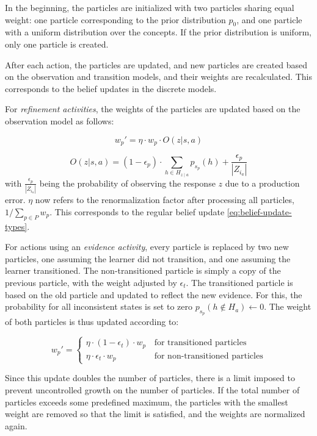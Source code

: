 In the beginning, the particles are initialized with two particles sharing equal weight: one particle corresponding to the prior distribution $p_0$, and one particle with a uniform distribution over the concepts. 
If the prior distribution is uniform, only one particle is created.

After each action, the particles are updated, and new particles are created based on the observation and transition models, and their weights are recalculated.
This corresponds to the belief updates in the discrete models.

For \textit{refinement activities}, the weights of the particles are updated based on the observation model as follows:

\begin{equation}
    w_p' = \eta \cdot w_p \cdot O(z|s,a)
\end{equation}

\begin{equation}
    O(z|s,a) = (1 - \epsilon_p) \cdot \sum_{h \in H_{z\mid a}}{p_{s_p}(h)} + \frac{\epsilon_p}{|Z_{i_a}|}
\end{equation}
with $\frac{\epsilon_p}{|Z_{i_a}|}$ being the probability of observing the response $z$ due to a production error.
$\eta$ now refers to the renormalization factor after processing all particles, $1 / \sum_{p \in P}{w_p}$.
This corresponds to the regular belief update \autoref{eq:belief-update-types}.

For actions using an \textit{evidence activity}, every particle is replaced by two new particles, one assuming the learner did not transition, and one assuming the learner transitioned.
The non-transitioned particle is simply a copy of the previous particle, with the weight adjusted by $\epsilon_t$.
The transitioned particle is based on the old particle and updated to reflect the new evidence. For this, the probability for all inconsistent states is set to zero $p_{s_p}(h \notin H_a) \leftarrow 0$.
The weight of both particles is thus updated according to:

\begin{equation}
    w_p' = \begin{cases} 
        \eta \cdot (1 - \epsilon_t) \cdot w_p & \, \text{for transitioned particles} \\
        \eta \cdot \epsilon_t \cdot w_p & \, \text{for non-transitioned particles}
    \end{cases}
\end{equation}

Since this update doubles the number of particles, there is a limit imposed to prevent uncontrolled growth on the number of particles.
If the total number of particles exceeds some predefined maximum, the particles with the smallest weight are removed so that the limit is satisfied, and the weights are normalized again.


